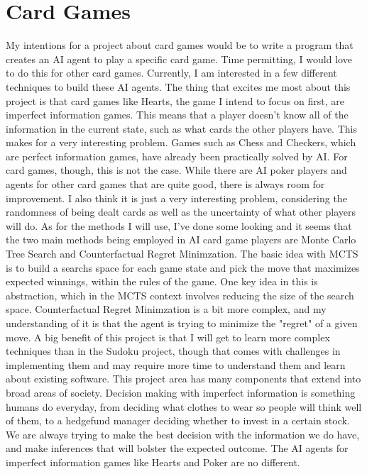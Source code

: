 \documentclass{article}
\begin{document}
\section{Card Games}
My intentions for a project about card games would be to write a program that creates an AI agent to play a specific card game. Time permitting, I would love to do this for other card games. Currently, I am interested in a few different techniques to build these AI agents.
The thing that excites me most about this project is that card games like Hearts, the game I intend to focus on first, are imperfect information games. This means that a player doesn't know all of the information in the current state, such as what cards the other players have. This makes for a very interesting problem. Games such as Chess and Checkers, which are perfect information games, have already been practically solved by AI. For card games, though, this is not the case. While there are AI poker players and agents for other card games that are quite good, there is always room for improvement. 
I also think it is just a very interesting problem, considering the randomness of being dealt cards as well as the uncertainty of what other players will do. As for the methods I will use, I've done some looking and it seems that the two main methods being employed in AI card game players are Monte Carlo Tree Search and Counterfactual Regret Minimzation. The basic idea with MCTS is to build a searchs space for each game state and pick the move that maximizes expected winnings, within the rules of the game.
One key idea in this is abstraction, which in the MCTS context involves reducing the size of the search space. Counterfactual Regret Minimzation is a bit more complex, and my understanding of it is that the agent is trying to minimize the "regret" of a given move. 
A big benefit of this project is that I will get to learn more complex techniques than in the Sudoku project, though that comes with challenges in implementing them and may require more time to understand them and learn about existing software.
This project area has many components that extend into broad areas of society. Decision making with imperfect information is something humans do everyday, from deciding what clothes to wear so people will think well of them, to a hedgefund manager deciding whether to invest in a certain stock. We are always trying to make the best decision with the information we do have, and make inferences that will bolster the expected outcome. The AI agents for imperfect information games like Hearts and Poker are no different.
\end{document}
